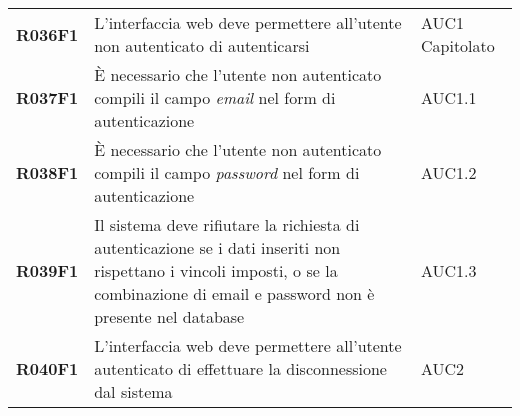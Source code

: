 \documentclass[../analisi-dei-requisiti.tex]{subfiles}
\begin{document}
\begin{longtable}[H]{>{\centering\bfseries}m{3cm} >{\centering}m{10cm} >{\centering\arraybackslash}m{3cm}}
  R036F1                  & L'interfaccia web deve permettere all'utente non autenticato di autenticarsi                                                                                                       & AUC1 Capitolato               \\
  R037F1                  & È necessario che l'utente non autenticato compili il campo \textit{email} nel form di autenticazione                                                                               & AUC1.1                        \\
  R038F1                  & È necessario che l'utente non autenticato compili il campo \textit{password} nel form di autenticazione                                                                            & AUC1.2                        \\
  R039F1                  & Il sistema deve rifiutare la richiesta di autenticazione se i dati inseriti non rispettano i vincoli imposti, o se la combinazione di email e password non è presente nel database & AUC1.3                        \\
  R040F1                  & L'interfaccia web deve permettere all'utente autenticato di effettuare la disconnessione dal sistema                                                                               & AUC2                          \\


\end{longtable}
\end{document}
